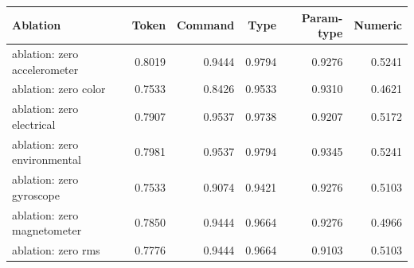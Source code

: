 \begin{tabular}{lrrrrr}
\toprule
Ablation & Token & Command & Type & Param-type & Numeric \\
\midrule
ablation: zero accelerometer & 0.8019 & 0.9444 & 0.9794 & 0.9276 & 0.5241 \\
ablation: zero color & 0.7533 & 0.8426 & 0.9533 & 0.9310 & 0.4621 \\
ablation: zero electrical & 0.7907 & 0.9537 & 0.9738 & 0.9207 & 0.5172 \\
ablation: zero environmental & 0.7981 & 0.9537 & 0.9794 & 0.9345 & 0.5241 \\
ablation: zero gyroscope & 0.7533 & 0.9074 & 0.9421 & 0.9276 & 0.5103 \\
ablation: zero magnetometer & 0.7850 & 0.9444 & 0.9664 & 0.9276 & 0.4966 \\
ablation: zero rms & 0.7776 & 0.9444 & 0.9664 & 0.9103 & 0.5103 \\
\bottomrule
\end{tabular}

